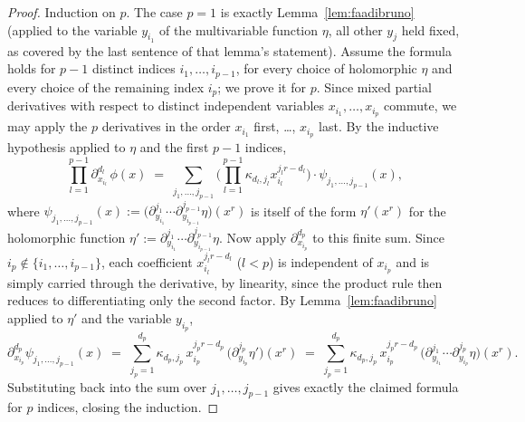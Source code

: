 \documentclass[11pt]{article}
\theoremstyle{remark}
\begin{document}
\begin{proof}
Induction on $p$. The case $p=1$ is exactly Lemma~\ref{lem:faadibruno} (applied to the variable $y_{i_1}$ of the multivariable function $\eta$, all other $y_j$ held fixed, as covered by the last sentence of that lemma's statement). Assume the formula holds for $p-1$ distinct indices $i_1,\dots,i_{p-1}$, for every choice of holomorphic $\eta$ and every choice of the remaining index $i_p$; we prove it for $p$. Since mixed partial derivatives with respect to distinct independent variables $x_{i_1},\dots,x_{i_p}$ commute, we may apply the $p$ derivatives in the order $x_{i_1}$ first, \dots, $x_{i_p}$ last. By the inductive hypothesis applied to $\eta$ and the first $p-1$ indices,
\[
\prod_{l=1}^{p-1}\partial_{x_{i_l}}^{d_l}\,\phi(x) \;=\; \sum_{j_1,\dots,j_{p-1}} \Big(\prod_{l=1}^{p-1}\kappa_{d_l,j_l}x_{i_l}^{j_lr-d_l}\Big)\cdot \psi_{j_1,\dots,j_{p-1}}(x),
\]
where $\psi_{j_1,\dots,j_{p-1}}(x):=\big(\partial_{y_{i_1}}^{j_1}\cdots\partial_{y_{i_{p-1}}}^{j_{p-1}}\eta\big)(x^r)$ is itself of the form $\eta'(x^r)$ for the holomorphic function $\eta':=\partial_{y_{i_1}}^{j_1}\cdots\partial_{y_{i_{p-1}}}^{j_{p-1}}\eta$. Now apply $\partial_{x_{i_p}}^{d_p}$ to this finite sum. Since $i_p\notin\{i_1,\dots,i_{p-1}\}$, each coefficient $x_{i_l}^{j_lr-d_l}$ ($l<p$) is independent of $x_{i_p}$ and is simply carried through the derivative, by linearity, since the product rule then reduces to differentiating only the second factor. By Lemma~\ref{lem:faadibruno} applied to $\eta'$ and the variable $y_{i_p}$,
\[
\partial_{x_{i_p}}^{d_p}\psi_{j_1,\dots,j_{p-1}}(x) \;=\; \sum_{j_p=1}^{d_p} \kappa_{d_p,j_p}\,x_{i_p}^{j_pr-d_p}\,\big(\partial_{y_{i_p}}^{j_p}\eta'\big)(x^r) \;=\; \sum_{j_p=1}^{d_p} \kappa_{d_p,j_p}\,x_{i_p}^{j_pr-d_p}\,\big(\partial_{y_{i_1}}^{j_1}\cdots\partial_{y_{i_p}}^{j_p}\eta\big)(x^r).
\]
Substituting back into the sum over $j_1,\dots,j_{p-1}$ gives exactly the claimed formula for $p$ indices, closing the induction.
\end{proof}
\end{document}
